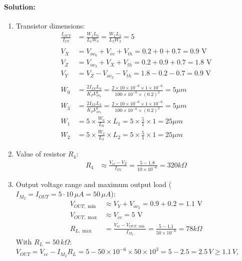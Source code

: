 \paragraph{Solution:}
\begin{enumerate}
  \item Transistor dimensions:
    \begin{align*}
      \frac{I_{OUT}}{I_{IN}} &= \frac{W_1 L_0}{L_1 W_0} = \frac{W_2 L_3}{L_2 W_3} = 5 \\
      \\
      V_{X} &= V_{ov_0} + V_{ee} + V_{th} = 0.2 + 0 + 0.7 = 0.9 \text{ V} \\
      V_{Z} &= V_{ov_3} + V_{X} + V_{th} = 0.2 + 0.9 + 0.7 = 1.8 \text{ V} \\
      V_{Y} &= V_{Z} - V_{ov_2} - V_{th} = 1.8 - 0.2 - 0.7 = 0.9 \text{ V} \\
      \\
      W_0 &= \frac{2 I_{IN} L_0}{K_P V_{ov_0}^2} = \frac{2 \times 10 \times 10^{-6} \times 1 \times 10^{-6}}{100 \times 10^{-6} \times (0.2)^2} = 5 \mu m \\
      W_3 &= \frac{2 I_{IN} L_3}{K_P V_{ov_3}^2} = \frac{2 \times 10 \times 10^{-6} \times 1 \times 10^{-6}}{100 \times 10^{-6} \times (0.2)^2} = 5 \mu m \\
      W_1 &= 5 \times \frac{W_0}{L_0} \times L_1 = 5 \times \frac{5}{1} \times 1 = 25 \mu m \\
      W_2 &= 5 \times \frac{W_3}{L_3} \times L_2 = 5 \times \frac{5}{1} \times 1 = 25 \mu m
    \end{align*}
  \item Value of resistor $R_4$:
    \begin{align*}
      R_4 &\approx \frac{V_{cc} - V_{Z}}
                      {I_{IN}} = \frac{5 - 1.8}{10 \times 10^{-6}} = 320 k\Omega
    \end{align*}
  \item Output voltage range and maximum output load
    (\(I_{M_2} = I_{OUT} = 5 \cdot 10\,\mu A = 50\,\mu A\)):
    \begin{align*}
      V_{OUT,\min} &\approx V_{Y} + V_{ov_2} = 0.9 + 0.2 = 1.1 \text{ V} \\
      V_{OUT,\max} &\approx V_{cc} = 5 \text{ V} \\
      R_{L, \max} &= \frac{V_{cc} - V_{OUT,\min}}{I_{M_2}} = \frac{5 - 1.1}{50 \times 10^{-6}} = 78 k\Omega
    \end{align*}
    With \(R_L = 50\,k\Omega\): \(V_{OUT} = V_{cc} - I_{M_2} R_L = 5 - 50 \times 10^{-6} \times 50 \times 10^{3} = 5 - 2.5 = 2.5\,V \geq 1.1\,V\),

\end{enumerate}
